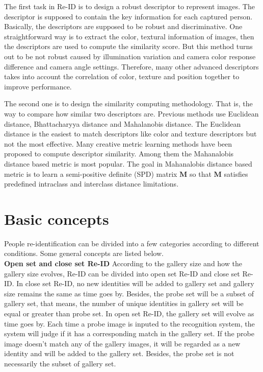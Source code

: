 The first task in Re-ID is to design a robust descriptor to represent images. The descriptor is supposed to contain the key information for each captured person. Basically, the descriptors are supposed to be robust and discriminative. One straightforward way is to extract the color, textural information of images, then the descriptors are used to compute the similarity score. But this method turns out to be not robust caused by illumination variation  and camera color response difference and camera angle settings.  Therefore, many other advanced descriptors takes into account the correlation of color, texture and position together to improve performance.

The second one is to design the similarity computing methodology. That is, the way to compare how similar two descriptors are. Previous methods use Euclidean distance, Bhattacharyya distance and Mahalanobis distance. The Euclidean distance is the easiest to match descriptors like color and texture descriptors but not the most effective. Many creative metric learning methods have been proposed to compute descriptor similarity. Among them the Mahanalobis distance based metric is most popular. The goal in Mahanalobis distance based metric is to learn a semi-positive definite (SPD) matrix $\bm{M}$ so that $\bm{M}$ satisfies predefined intraclass and interclass distance limitations.
	
\section{Basic concepts}
People re-identification can be divided into a few categories according to different conditions. Some general concepts are listed below.\\
\indent \textbf{Open set and close set Re-ID} \cite{REIDsurvey} According to the gallery size and how the gallery size evolves, Re-ID can be divided into open set Re-ID and close set Re-ID. In close set Re-ID, no new identities will be added to gallery set and gallery size remains the same as time goes by. Besides, the probe set will be a subset of gallery set, that means, the number of unique identities in gallery set will be equal or greater than probe set. In open set Re-ID, the gallery set will evolve as time goes by. Each time a probe image is inputed to the recognition system, the system will judge if it has a corresponding match in the gallery set. If the probe image doesn't match any of the gallery images, it will be regarded as a new identity and will be added to the gallery set. Besides, the probe set is not necessarily the subset of gallery set. 

